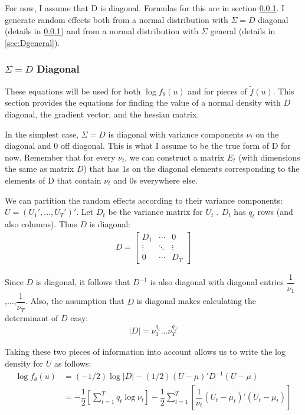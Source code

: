 \documentclass{article}
\begin{document}
For now, I  assume that  D is diagonal. Formulas for this are in section \ref{sec:Ddiag}.  I generate random effects both from a normal distribution with $\Sigma=D$ diagonal (details in \ref{sec:Ddiag}) and from a normal distribution with $\Sigma$ general (details in \ref{sec:Dgeneral}).

\subsubsection{$\Sigma=D$ Diagonal}\label{sec:Ddiag}
These equations will be used for both $\log f_\theta(u)$ and for pieces of $\tilde{f}(u)$.  This section provides the equations for finding the value  of a normal density with $D$ diagonal, the gradient vector, and the hessian matrix.


In the simplest case, $\Sigma=D$ is diagonal with variance components $\nu_t$ on the diagonal and 0 off diagonal. This is what I assume to be the true form of D for now.  Remember that for every $\nu_t$, we can construct a matrix $E_t$ (with dimensions the same as matrix $D$) that has 1s on the diagonal elements corresponding to the elements of D that contain $\nu_t$ and 0s everywhere else.  

We can partition the random effects according to their variance components: $U=(U_1',...,U_T')'$.  Let $D_t$ be the variance matrix for $U_t$ . $D_t$ has $q_t$ rows (and also columns). Thus $D$ is diagonal:
\begin{align}
D = \begin{bmatrix} D_1 & \cdots & 0 \\ \vdots & \ddots & \vdots \\ 0 & \cdots & D_T \end{bmatrix}
\end{align}

Since $D$ is diagonal, it follows that $D^{-1}$ is also diagonal with diagonal entries $\dfrac{1}{\nu_1}$,...,$\dfrac{1}{\nu_T}$.  Also, the assumption that $D$ is diagonal makes calculating the determinant of $D$  easy:
\begin{align}
|D|= \nu_1^{q_1}...\nu_T^{q_T}
\end{align}

 Taking these two pieces of information into account allows us to write the log density for $U$ as follows:
\begin{align}
\log f_\theta(u) &= (-1/2) \log |D| - (1/2) (U-\mu)' D^{-1} (U-\mu)\\
&= -\dfrac{1}{2} \left[  \sum_{t=1}^T q_t \log \nu_t   \right]  -\dfrac{1}{2} \sum_{t=1}^T \left[ \dfrac{1}{\nu_t} (U_t-\mu_t)'(U_t-\mu_t)   \right]
\end{align}
\end{document}
